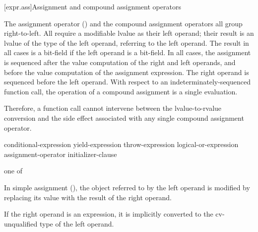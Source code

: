 [expr.ass]{Assignment and compound assignment operators}%

\pnum
{}%
%
%
%
%
%
%
%
%
%
%
%
The assignment operator (\tcode{=}) and the compound assignment
operators all group right-to-left.
%
All
require a modifiable lvalue as their left operand; their result is an lvalue
of the type of the left operand, referring to the left operand. The result in all cases is a bit-field if
the left operand is a bit-field. In all cases, the assignment is
sequenced after the
%
value computation of the right and left operands,
and before the
value computation of the assignment expression.
The right operand is sequenced before the left operand.
With
respect to an indeterminately-sequenced function call, the operation of
a compound assignment is a single evaluation.
\begin{note}
Therefore, a function call cannot intervene between the
lvalue-to-rvalue conversion and the side effect associated with any
single compound assignment operator.
\end{note}

\begin{bnf}
\br
    conditional-expression\br
    yield-expression\br
    throw-expression\br
    logical-or-expression assignment-operator initializer-clause
\end{bnf}

\begin{bnf}
 \textnormal{one of}\br
    \terminal{=  *=  /=  \%=   +=  -=  >>=  <<=  \&=  \caret=  |=}
\end{bnf}

\pnum
In simple assignment (\tcode{=}), the object referred to by the left operand
is modified
by replacing its value with the result of the right operand.

\pnum
{}%
If the right operand is an expression, it is implicitly
converted to the cv-unqualified type of the left
operand.

